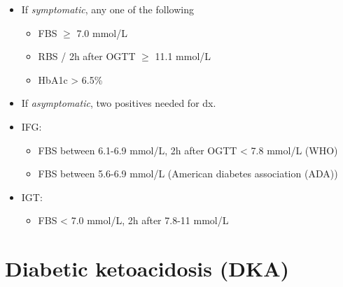 \documentclass[
  12pt,
]{memoir}
\providecommand{\tightlist}{%
  \setlength{\itemsep}{0pt}\setlength{\parskip}{0pt}}
\begin{document}
\begin{itemize}
\tightlist
\item
  If \emph{symptomatic}, any one of the following

  \begin{itemize}
  \tightlist
  \item
    FBS \(\ge\) 7.0 mmol/L
  \item
    RBS / 2h after OGTT \(\ge\) 11.1 mmol/L
  \item
    HbA1c \textgreater{} 6.5\%
  \end{itemize}
\item
  If \emph{asymptomatic}, two positives needed for dx.
\item
  IFG:

  \begin{itemize}
  \tightlist
  \item
    FBS between 6.1-6.9 mmol/L, 2h after OGTT \textless{} 7.8 mmol/L
    (WHO)
  \item
    FBS between 5.6-6.9 mmol/L (American diabetes association (ADA))
  \end{itemize}
\item
  IGT:

  \begin{itemize}
  \tightlist
  \item
    FBS \textless{} 7.0 mmol/L, 2h after 7.8-11 mmol/L
  \end{itemize}
\end{itemize}

\pagebreak

\hypertarget{diabetic-ketoacidosis-dka}{%
\section{Diabetic ketoacidosis (DKA)}\label{diabetic-ketoacidosis-dka}}
\end{document}
